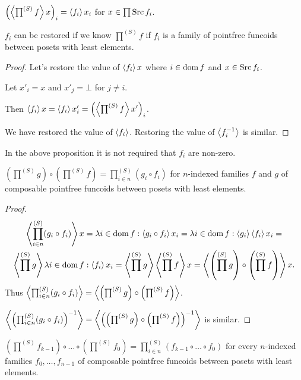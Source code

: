 \begin{obvious}
$\left(\left\langle \prod^{(S)}f\right\rangle x\right)_{i}=\left\langle f_{i}\right\rangle x_{i}$ for
$x\in\prod\operatorname{Src} f_{i}$.\end{obvious}
\begin{prop}
$f_{i}$ can be restored if we know $\prod^{(S)}f$ if $f_{i}$ is
a family of pointfree funcoids between posets with least elements.\end{prop}
\begin{proof}
Let's restore the value of $\left\langle f_{i}\right\rangle x$ where $i\in\operatorname{dom} f$
and $x\in\operatorname{Src} f_{i}$.

Let $x'_{i}=x$ and $x'_{j}=\bot$ for $j\neq i$.

Then $\left\langle f_{i}\right\rangle x=\left\langle f_{i}\right\rangle x'_{i}=\left(\left\langle \prod^{(S)}f\right\rangle x'\right)_{i}$.

We have restored the value of $\left\langle f_{i}\right\rangle$. Restoring the value
of $\left\langle f_{i}^{-1}\right\rangle$ is similar.\end{proof}
\begin{rem}
In the above proposition it is not required that $f_{i}$ are non-zero.\end{rem}
\begin{prop}
$\left(\prod^{(S)}g\right)\circ\left(\prod^{(S)}f\right)=\prod_{i\in n}^{(S)}(g_{i}\circ f_{i})$
for $n$-indexed families $f$ and $g$ of composable pointfree funcoids
between posets with least elements.\end{prop}
\begin{proof}
~
\begin{multline*}
\left\langle \prod_{i\in n}^{(S)}(g_{i}\circ f_{i})\right\rangle x=\lambda i\in\operatorname{dom} f:\left\langle g_{i}\circ f_{i}\right\rangle x_{i}=\lambda i\in\operatorname{dom} f:\left\langle g_{i}\right\rangle\left\langle f_{i}\right\rangle x_{i}=\\
\left\langle \prod^{(S)}g\right\rangle\lambda i\in\operatorname{dom} f:\left\langle f_{i}\right\rangle x_{i}=\left\langle \prod^{(S)}g\right\rangle\left\langle \prod^{(S)}f\right\rangle x=\left\langle \left(\prod^{(S)}g\right)\circ\left(\prod^{(S)}f\right)\right\rangle x.
\end{multline*}
Thus $\left\langle \prod_{i\in n}^{(S)}(g_{i}\circ f_{i})\right\rangle=\left\langle \left(\prod^{(S)}g\right)\circ\left(\prod^{(S)}f\right)\right\rangle$.

$\left\langle \left(\prod_{i\in n}^{(S)}(g_{i}\circ f_{i})\right)^{-1}\right\rangle=\left\langle \left(\left(\prod^{(S)}g\right)\circ\left(\prod^{(S)}f\right)\right)^{-1}\right\rangle$
is similar.\end{proof}
\begin{cor}
$\left(\prod^{(S)}f_{k-1}\right)\circ\ldots\circ\left(\prod^{(S)}f_{0}\right)=\prod_{i\in n}^{(S)}(f_{k-1}\circ\ldots\circ f_{0})$
for every $n$-indexed families $f_{0},\ldots,f_{n-1}$ of composable
pointfree funcoids between posets with least elements.
\end{cor}

